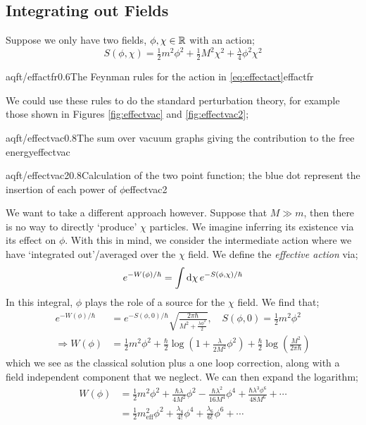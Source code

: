 \subsection{Integrating out Fields} 
Suppose we only have two fields, $\phi, \chi \in \mathbb{R}$ with an action;
\begin{equation}
\label{eq:effectact}
S(\phi, \chi) = \tfrac{1}{2}m^2 \phi^2 + \tfrac{1}{2}M^2 \chi^2 + \tfrac{\lambda}{4}\phi^2\chi^2
\end{equation}
\begin{mygraphic}{aqft/effactfr}{0.6}{The Feynman rules for the action in \eqref{eq:effectact}}{effactfr}\end{mygraphic}
We could use these rules to do the standard perturbation theory, for example those shown in Figures \ref{fig:effectvac} and \ref{fig:effectvac2};
\begin{mygraphic}{aqft/effectvac}{0.8}{The sum over vacuum graphs giving the contribution to the free energy}{effectvac}\end{mygraphic}
\begin{mygraphic}{aqft/effectvac2}{0.8}{Calculation of the two point function; the blue dot represent the insertion of each power of $\phi$}{effectvac2}\end{mygraphic}
We want to take a different approach however. Suppose that $M \gg m$, then there is no way to directly `produce' $\chi$ particles. We imagine inferring its existence via its effect on $\phi$. With this in mind, we consider the intermediate action where we have `integrated out'/averaged over the $\chi$ field. We define the \emph{effective action} via;
\begin{equation*}
e^{-W(\phi)/\hbar} = \int{\text{d}\chi \,e^{-S(\phi, \chi)/\hbar}}
\end{equation*}
In this integral, $\phi$ plays the role of a source for the $\chi$ field. We find that;
\begin{align*}
e^{-W(\phi)/\hbar} &= e^{-S(\phi, 0)/\hbar}\sqrt{\frac{2\pi\hbar}{M^2 + \frac{\lambda\phi^2}{2}}}, \quad S(\phi, 0) = \tfrac{1}{2}m^2 \phi^2 \\
\Rightarrow W(\phi) &= \frac{1}{2}m^2 \phi^2 + \frac{\hbar}{2}\log\left(1 + \frac{\lambda}{2M^2}\phi^2\right) + \frac{\hbar}{2}\log\left(\frac{M^2}{2\pi\hbar}\right)
\end{align*}
which we see as the classical solution plus a one loop correction, along with a field independent component that we neglect. We can then expand the logarithm;
\begin{align*}
W(\phi) &= \frac{1}{2}m^2\phi^2 + \frac{\hbar \lambda}{4M^2}\phi^2 - \frac{\hbar\lambda^2}{16M^4}\phi^4 + \frac{\hbar\lambda^3\phi^6}{48M^6} + \cdots \\
&= \frac{1}{2}m^2_{\text{eff}}\phi^2 + \frac{\lambda_4}{4!}\phi^4 + \frac{\lambda_6}{6!}\phi^6 + \cdots
\end{align*}
